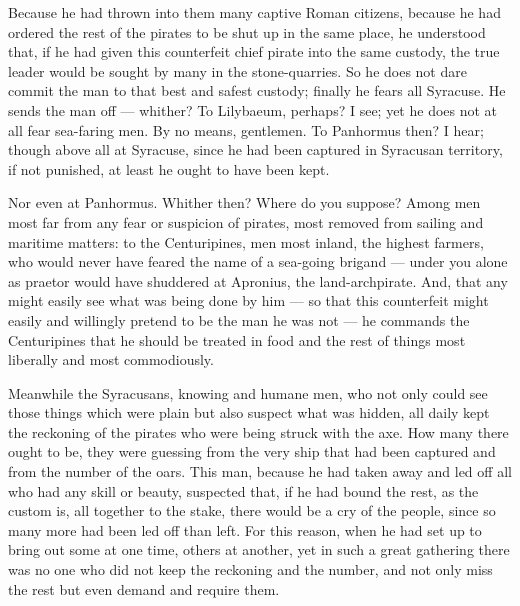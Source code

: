  Because he had thrown into them many captive Roman citizens, because he had ordered the rest of the pirates to be shut up in the same place, he understood that, if he had given this counterfeit chief pirate into the same custody, the true leader would be sought by many in the stone-quarries. So he does not dare commit the man to that best and safest custody; finally he fears all Syracuse. He sends the man off --- whither? To Lilybaeum, perhaps? I see; yet he does not at all fear sea-faring men. By no means, gentlemen. To Panhormus then? I hear; though above all at Syracuse, since he had been captured in Syracusan territory, if not punished, at least he ought to have been kept.

 Nor even at Panhormus. Whither then? Where do you suppose? Among men most far from any fear or suspicion of pirates, most removed from sailing and maritime matters: to the Centuripines, men most inland, the highest farmers, who would never have feared the name of a sea-going brigand --- under you alone as praetor would have shuddered at Apronius, the land-archpirate. And, that any might easily see what was being done by him --- so that this counterfeit might easily and willingly pretend to be the man he was not --- he commands the Centuripines that he should be treated in food and the rest of things most liberally and most commodiously.

 Meanwhile the Syracusans, knowing and humane men, who not only could see those things which were plain but also suspect what was hidden, all daily kept the reckoning of the pirates who were being struck with the axe. How many there ought to be, they were guessing from the very ship that had been captured and from the number of the oars. This man, because he had taken away and led off all who had any skill or beauty, suspected that, if he had bound the rest, as the custom is, all together to the stake, there would be a cry of the people, since so many more had been led off than left. For this reason, when he had set up to bring out some at one time, others at another, yet in such a great gathering there was no one who did not keep the reckoning and the number, and not only miss the rest but even demand and require them.

